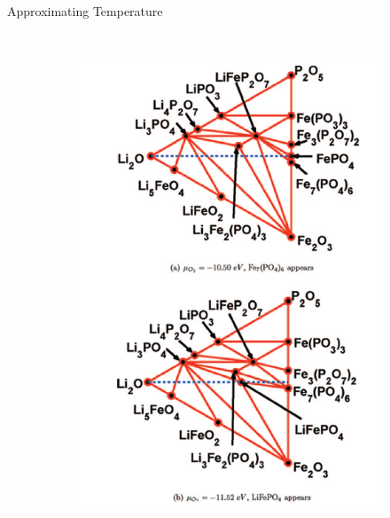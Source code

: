 \documentclass[aspectratio=169]{beamer}
\begin{document}
\begin{frame}{Approximating Temperature}
\begin{columns}
            \begin{figure}
                \centering
                \begin{subfigure}{0.47\textwidth}
                    \centering
                    \includegraphics[width=\linewidth]{lectures/figures/10_LFP_PD.png}
                \end{subfigure}
                \begin{subfigure}{0.47\textwidth}
                    \centering

\end{subfigure}
\end{figure}
\end{columns}
\end{frame}
\end{document}

